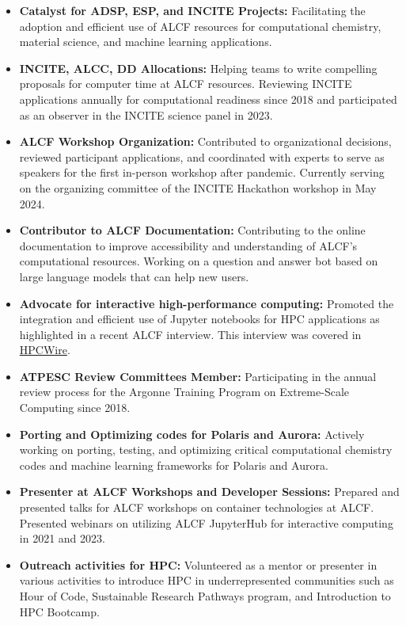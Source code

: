 \begin{itemize}
    \item \textbf{Catalyst for ADSP, ESP, and INCITE Projects:} Facilitating the adoption and efficient use of ALCF resources for computational chemistry, material science, and machine learning applications.
    \item \textbf{INCITE, ALCC, DD  Allocations:} Helping teams to write compelling proposals for computer time at ALCF resources. Reviewing INCITE applications annually for computational readiness since 2018 and participated as an observer in the INCITE science panel in 2023.
    \item \textbf{ALCF Workshop Organization:} Contributed to organizational decisions, reviewed participant applications, and coordinated with experts to serve as speakers for the first in-person workshop after pandemic. Currently serving on the organizing committee of the INCITE Hackathon workshop in May 2024.
    \item \textbf{Contributor to ALCF Documentation:} Contributing to the online documentation to improve accessibility and understanding of ALCF's computational resources. Working on a question and answer bot based on large language models that can help new users.
    \item \textbf{Advocate for interactive high-performance computing:} Promoted the integration and efficient use of Jupyter notebooks for HPC applications as highlighted in a recent ALCF interview. This interview was covered in \href{https://www.hpcwire.com/off-the-wire/argonnes-murat-keceli-helps-prepare-jupyter-notebooks-for-aurora/}{HPCWire}.
    \item \textbf{ATPESC Review Committees Member:} Participating in the annual review process for the Argonne Training Program on Extreme-Scale Computing since 2018.
    \item \textbf{Porting and Optimizing codes for Polaris and Aurora:} Actively working on porting, testing, and optimizing critical computational chemistry codes and machine learning frameworks for Polaris and Aurora.
    \item \textbf{Presenter at ALCF Workshops and Developer Sessions:} Prepared and presented talks for ALCF workshops on container technologies at ALCF. Presented webinars on utilizing ALCF JupyterHub for interactive computing in 2021 and 2023.
    \item \textbf{Outreach activities for HPC:} 
    Volunteered as a mentor or presenter in various activities to introduce HPC in underrepresented communities such as Hour of Code, Sustainable Research Pathways program, and Introduction to HPC Bootcamp.
\end{itemize}